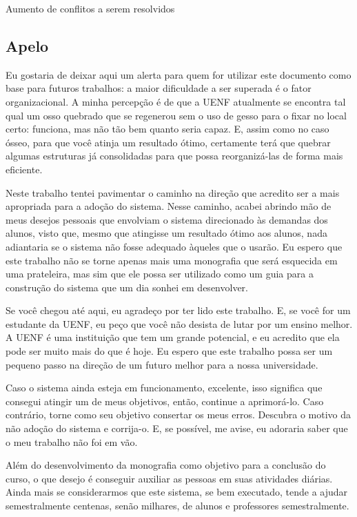 Aumento de conflitos a serem resolvidos

\subsection*{Apelo}

Eu gostaria de deixar aqui um alerta para quem for utilizar este documento como base para futuros trabalhos: a maior dificuldade a ser superada é o fator organizacional. A minha percepção é de que a UENF atualmente se encontra tal qual um osso quebrado que se regenerou sem o uso de gesso para o fixar no local certo: funciona, mas não tão bem quanto seria capaz. E, assim como no caso ósseo, para que você atinja um resultado ótimo, certamente terá que quebrar algumas estruturas já consolidadas para que possa reorganizá-las de forma mais eficiente.

Neste trabalho tentei pavimentar o caminho na direção que acredito ser a mais apropriada para a adoção do sistema. Nesse caminho, acabei abrindo mão de meus desejos pessoais que envolviam o sistema direcionado às demandas dos alunos, visto que, mesmo que atingisse um resultado ótimo aos alunos, nada adiantaria se o sistema não fosse adequado àqueles que o usarão. Eu espero que este trabalho não se torne apenas mais uma monografia que será esquecida em uma prateleira, mas sim que ele possa ser utilizado como um guia para a construção do sistema que um dia sonhei em desenvolver.

Se você chegou até aqui, eu agradeço por ter lido este trabalho. E, se você for um estudante da UENF, eu peço que você não desista de lutar por um ensino melhor. A UENF é uma instituição que tem um grande potencial, e eu acredito que ela pode ser muito mais do que é hoje. Eu espero que este trabalho possa ser um pequeno passo na direção de um futuro melhor para a nossa universidade.

Caso o sistema ainda esteja em funcionamento, excelente, isso significa que consegui atingir um de meus objetivos, então, continue a aprimorá-lo. Caso contrário, torne como seu objetivo consertar os meus erros. Descubra o motivo da não adoção do sistema e corrija-o. E, se possível, me avise, eu adoraria saber que o meu trabalho não foi em vão.

Além do desenvolvimento da monografia como objetivo para a conclusão do curso, o que desejo é conseguir auxiliar as pessoas em suas atividades diárias. Ainda mais se considerarmos que este sistema, se bem executado, tende a ajudar semestralmente centenas, senão milhares, de alunos e professores semestralmente.
